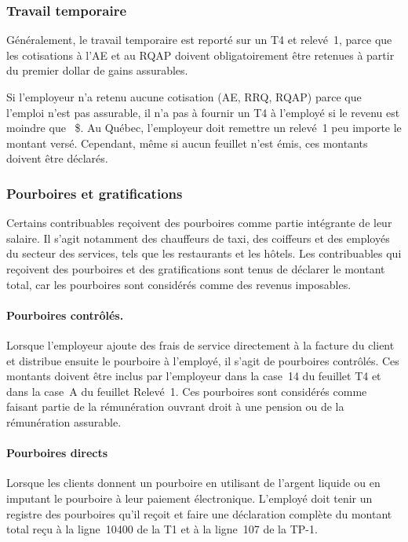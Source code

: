 \subsubsection{Travail temporaire}
Généralement, le travail temporaire est reporté sur un T4 et relevé~1, parce que les cotisations à l'AE et au RQAP doivent obligatoirement être retenues à partir du premier dollar de gains assurables.

Si l'employeur n'a retenu aucune cotisation (AE, RRQ, RQAP) parce que l'emploi n'est pas assurable, il n'a pas à fournir un T4 à l'employé si le revenu est moindre que ~\$. Au Québec, l'employeur doit remettre un relevé~1 peu importe le montant versé. Cependant, même si aucun feuillet n'est émis, ces montants doivent être déclarés.

\subsubsection{Pourboires et gratifications}
Certains contribuables reçoivent des pourboires comme partie intégrante de leur salaire. Il s'agit notamment des chauffeurs de taxi, des coiffeurs et des employés du secteur des services, tels que les restaurants et les hôtels. Les contribuables qui reçoivent des pourboires et des gratifications sont tenus de déclarer le montant total, car les pourboires sont considérés comme des revenus imposables.

\paragraph{Pourboires contrôlés.}
Lorsque l'employeur ajoute des frais de service directement à la facture du client et distribue ensuite le pourboire à l'employé, il s'agit de pourboires contrôlés. Ces montants doivent être inclus par l'employeur dans la case~14 du feuillet T4 et dans la case~A du feuillet Relevé~1. Ces pourboires sont considérés comme faisant partie de la rémunération ouvrant droit à une pension ou de la rémunération assurable.

\paragraph{Pourboires directs}
Lorsque les clients donnent un pourboire en utilisant de l'argent liquide ou en imputant le pourboire à leur paiement électronique. L'employé doit tenir un registre des pourboires qu'il reçoit et faire une déclaration complète du montant total reçu à la ligne~10400 de la T1 et à la ligne~107 de la TP-1.

